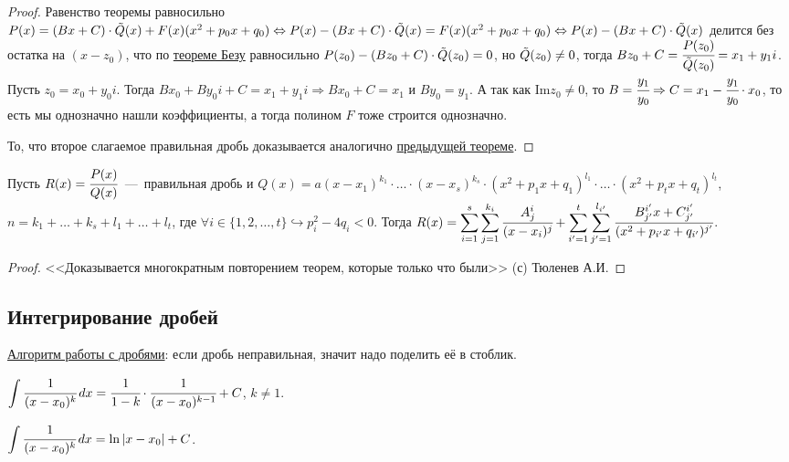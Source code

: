 \begin{proof}
    Равенство теоремы равносильно $P (x) = (Bx + C) \cdot \Tilde{Q} (x) + F (x) (x^2 + p_{0} x + q_{0}) \Leftrightarrow P (x) - (Bx + C) \cdot \Tilde{Q} (x) = F (x) (x^2 + p_{0} x + q_{0}) \Leftrightarrow P (x) - (Bx + C) \cdot \Tilde{Q} (x)$ делится без остатка на $(x - z_{0})$, что по \hyperlink{thm6.5}{теореме Безу} равносильно $P (z_{0}) - (B z_{0} + C) \cdot \Tilde{Q} (z_{0}) = 0$, но $\Tilde{Q} (z_{0}) \neq 0$, тогда $B z_{0} + C = \cfrac{P (z_{0})}{\Tilde{Q} (z_{0})} = x_{1} + y_{1} i$. Пусть $z_{0} = x_{0} + y_{0} i$. Тогда $B x_{0} + B y_{0} i + C = x_{1} + y_{1} i \Rightarrow B x_{0} + C = x_{1}$ и $B y_{0} = y_{1}$. А так как $\text{Im}z_{0} \neq 0$, то $B = \cfrac{y_{1}}{y_{0}} \Rightarrow C = x_{1} - \cfrac{y_{1}}{y_{0}} \cdot x_{0}$, то есть мы однозначно нашли коэффициенты, а тогда полином $F$ тоже строится однозначно.

    То, что второе слагаемое правильная дробь доказывается аналогично \hyperlink{thm6.8}{предыдущей теореме}.
\end{proof}
\begin{corollary}
    Пусть $R (x) = \cfrac{P (x)}{Q (x)}$~---~правильная дробь и $Q (x) = a (x - x_{1})^{k_{1}} \cdot \ldots \cdot (x - x_{s})^{k_{s}} \cdot (x^{2} + p_{1} x + q_{1})^{l_{1}} \cdot \ldots \cdot (x^{2} + p_{t} x + q_{t})^{l_{t}}$, $n = k_{1} + \ldots + k_{s} + l_{1} + \ldots + l_{t}$, где $\forall i \in \{ 1, 2, \ldots, t \} \hookrightarrow p^2_{i} - 4 q_{i} < 0$. Тогда $R (x) = \displaystyle \sum_{i = 1}^{s} \sum_{j = 1}^{k_{i}} \cfrac{A^{i}_{j}}{(x - x_{i})^{j}} + \sum_{i' = 1}^{t} \sum_{j' = 1}^{l_{i'}} \cfrac{B^{i'}_{j'} x + C^{i'}_{j'}}{(x^2 + p_{i'} x + q_{i'})^{j'}}$.
\end{corollary}
\begin{proof}
    <<Доказывается многократным повторением теорем, которые только что были>> (с) Тюленев А.И.
\end{proof}

\subsection{Интегрирование дробей}
\underline{Алгоритм работы с дробями}: если дробь неправильная, значит надо поделить её в стоблик.

$\displaystyle \int \cfrac{1}{(x - x_{0})^{k}} \, dx = \cfrac{1}{1 - k} \cdot \cfrac{1}{(x - x_{0})^{k - 1}} + C$, $k \neq 1$.

$\displaystyle \int \cfrac{1}{(x - x_{0})^{k}} \, dx = \ln{|x - x_{0}| + C}$.

